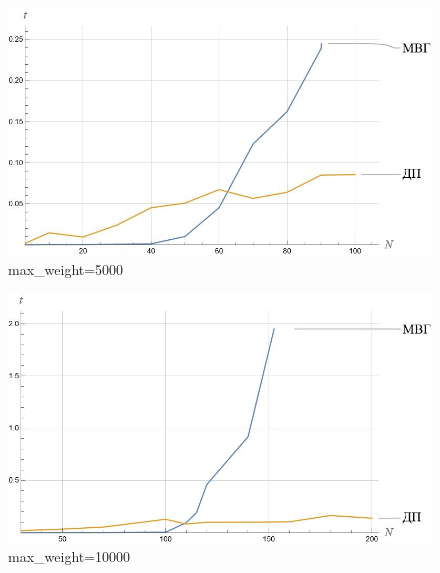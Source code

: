 \documentclass[12pt, a4paper]{article}
\begin{document}
	\begin{figure}[H]
		\centering
		\includegraphics[scale=0.8]{plot3}
		\caption{max\_weight=5000}
	\end{figure}
	\begin{figure}[H]
		\centering
		\includegraphics[scale=0.8]{plot4}
		\caption{max\_weight=10000}	
	\end{figure}	
	
\end{document}
